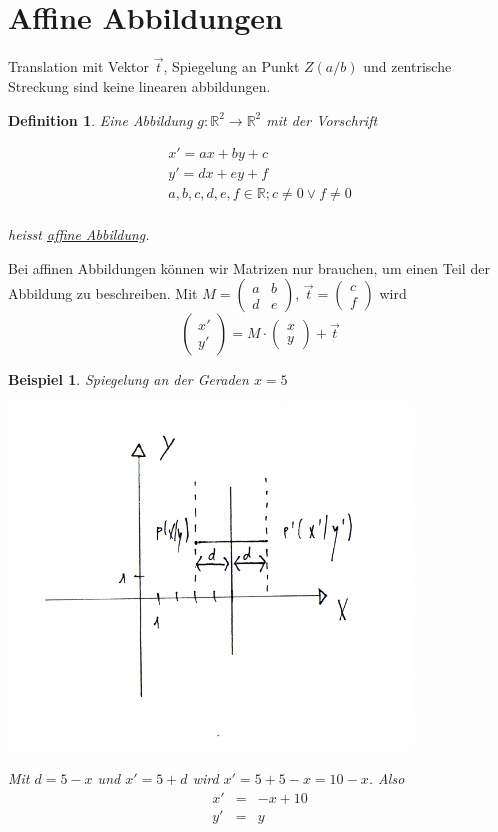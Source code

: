\documentclass[a4paper,10pt]{report}
\newtheorem{mydef}{Definition}
\newtheorem{myexample}{Beispiel}
\newenvironment{mathbox}
{\par\smallskip\centering\begin{lrbox}{0}%
\begin{minipage}[c]{\textwidth}}
{\end{minipage}\end{lrbox}%
\framebox[\textwidth]{\usebox{0}}%
\par\medskip
\ignorespacesafterend}
\begin{document}
\section{Affine Abbildungen}
Translation mit Vektor $\vec{t}$, Spiegelung an Punkt $Z(a/b)$ und zentrische Streckung sind keine linearen abbildungen. 
\begin{mydef}
Eine Abbildung $g: \mathbb{R}^2 \to \mathbb{R}^2$ mit der Vorschrift\\
\begin{mathbox}
\begin{eqnarray*}
x' = ax+by+c\\
y' = dx+ey+f\\
a,b,c,d,e,f \in \mathbb{R}; c \neq 0 \lor f \neq 0\\
\end{eqnarray*}
\end{mathbox}
\bigskip
\noindent heisst \underline{affine Abbildung}.
\end{mydef}
\noindent
Bei affinen Abbildungen können wir Matrizen nur brauchen, um einen Teil der Abbildung zu beschreiben. Mit $M = \begin{pmatrix}a&b\\d&e\end{pmatrix}$, $\vec{t}=\begin{pmatrix}c\\f\end{pmatrix}$ wird
\begin{equation*}
\begin{pmatrix}x'\\y'\end{pmatrix} = M\cdot \begin{pmatrix}x\\y\end{pmatrix} + \vec{t}
\end{equation*}
\begin{myexample}
Spiegelung an der Geraden $x=5$
\begin{center}
	 \includegraphics[width=0.8\textwidth]{imgs/SpiegelungGeraden.png}
\end{center}
Mit $d=5-x$ und $x'=5+d$ wird $x'=5+5-x=10-x$. Also
\begin{eqnarray*}
x' &=& -x +10\\
y' &=& y
\end{eqnarray*}
\end{myexample}
\end{document}
